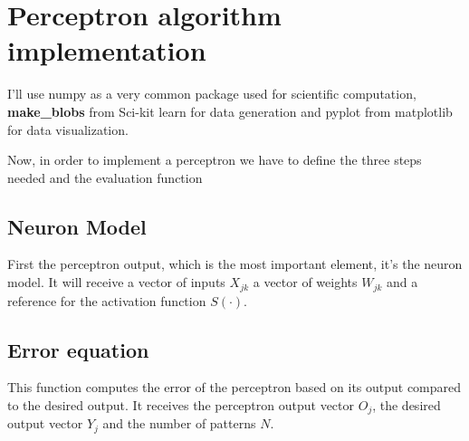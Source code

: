 \section{Perceptron algorithm
implementation}\label{perceptron-algorithm-implementation}

I'll use numpy as a very common package used for scientific computation,
\textbf{make\_blobs} from Sci-kit learn for data generation and pyplot
from matplotlib for data visualization.

\begin{Shaded}
\begin{Highlighting}[]
\end{Highlighting}
\end{Shaded}

Now, in order to implement a perceptron we have to define the three
steps needed and the evaluation function

\subsection{Neuron Model}\label{neuron-model}

First the perceptron output, which is the most important element, it's
the neuron model. It will receive a vector of inputs \(X_{jk}\) a vector
of weights \(W_{jk}\) and a reference for the activation function
\(S(\cdot)\).

\begin{Shaded}
\begin{Highlighting}[]
\OperatorTok{=}
\OperatorTok{=}\OperatorTok{{-}}
\OperatorTok{=}
\end{Highlighting}
\end{Shaded}

\subsection{Error equation}\label{error-equation}

This function computes the error of the perceptron based on its output
compared to the desired output. It receives the perceptron output vector
\(O_j\), the desired output vector \(Y_j\) and the number of patterns
\(N\).

